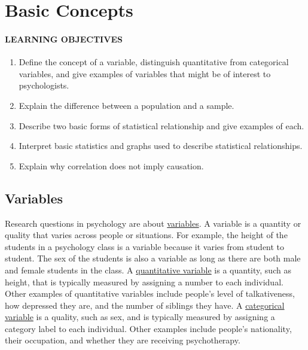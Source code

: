 \documentclass[
]{krantz}
\providecommand{\tightlist}{%
  \setlength{\itemsep}{0pt}\setlength{\parskip}{0pt}}
\begin{document}
\hypertarget{basic-concepts}{%
\section{Basic Concepts}\label{basic-concepts}}

\hypertarget{learning-objectives-4}{%
\paragraph*{LEARNING OBJECTIVES}\label{learning-objectives-4}}

\begin{enumerate}
\def\labelenumi{\arabic{enumi}.}
\tightlist
\item
  Define the concept of a variable, distinguish quantitative from categorical variables, and give examples of variables that might be of interest to psychologists.
\item
  Explain the difference between a population and a sample.
\item
  Describe two basic forms of statistical relationship and give examples of each.
\item
  Interpret basic statistics and graphs used to describe statistical relationships.
\item
  Explain why correlation does not imply causation.
\end{enumerate}

\hypertarget{variables}{%
\subsection*{Variables}\label{variables}}


Research questions in psychology are about \protect\hyperlink{variable}{variables}. A variable is a quantity or quality that varies across people or situations. For example, the height of the students in a psychology class is a variable because it varies from student to student. The sex of the students is also a variable as long as there are both male and female students in the class. A \protect\hyperlink{quantitative-variable}{quantitative variable} is a quantity, such as height, that is typically measured by assigning a number to each individual. Other examples of quantitative variables include people's level of talkativeness, how depressed they are, and the number of siblings they have. A \protect\hyperlink{categorical-variable}{categorical variable} is a quality, such as sex, and is typically measured by assigning a category label to each individual. Other examples include people's nationality, their occupation, and whether they are receiving psychotherapy.
\end{document}
